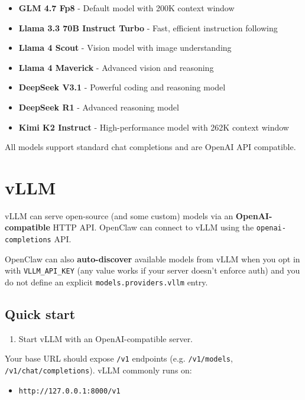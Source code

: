 \begin{itemize}
  \item \textbf{GLM 4.7 Fp8} - Default model with 200K context window
  \item \textbf{Llama 3.3 70B Instruct Turbo} - Fast, efficient instruction following
  \item \textbf{Llama 4 Scout} - Vision model with image understanding
  \item \textbf{Llama 4 Maverick} - Advanced vision and reasoning
  \item \textbf{DeepSeek V3.1} - Powerful coding and reasoning model
  \item \textbf{DeepSeek R1} - Advanced reasoning model
  \item \textbf{Kimi K2 Instruct} - High-performance model with 262K context window
\end{itemize}


All models support standard chat completions and are OpenAI API compatible.


\clearpage

\section{vLLM}


vLLM can serve open-source (and some custom) models via an \textbf{OpenAI-compatible} HTTP API. OpenClaw can connect to vLLM using the \texttt{openai-completions} API.

OpenClaw can also \textbf{auto-discover} available models from vLLM when you opt in with \texttt{VLLM\_API\_KEY} (any value works if your server doesn’t enforce auth) and you do not define an explicit \texttt{models.providers.vllm} entry.

\subsection{Quick start}


\begin{enumerate}
  \item Start vLLM with an OpenAI-compatible server.
\end{enumerate}


Your base URL should expose \texttt{/v1} endpoints (e.g. \texttt{/v1/models}, \texttt{/v1/chat/completions}). vLLM commonly runs on:

\begin{itemize}
  \item \texttt{http://127.0.0.1:8000/v1}
\end{itemize}


